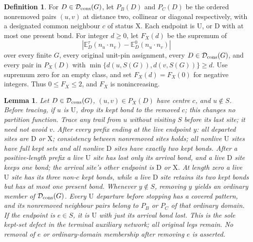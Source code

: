 \documentclass[11pt,reqno]{amsart}
\newtheorem{lemma}[theorem]{Lemma}
\theoremstyle{definition}
\newtheorem{definition}[theorem]{Definition}
\theoremstyle{remark}
\begin{document}
\begin{definition}\label{d:pairenv}
For \(D\in\mathcal D_{\rm cons}(G)\), let \(P_B(D)\) and \(P_C(D)\)
be the ordered nonremoved pairs \((u,v)\) at distance two,
collinear or diagonal respectively, with a designated common neighbour
\(c\) of status \(\mathrm X\). Each endpoint is \(\mathrm U\),
or \(\mathrm D\) with at most one present bond.
For integer \(d\ge0\), let \(F_X(d)\) be the supremum of
\[
 \left|\mathbb E_D^\tau(n_u\cdot n_v)
                    -\mathbb E_D^0(n_u\cdot n_v)\right|
\]
over every finite \(G\), every original unit-pin assignment,
every \(D\in\mathcal D_{\rm cons}(G)\), and every pair in \(P_X(D)\)
with \(\min\{d(u,S(G)),d(v,S(G))\}\ge d\).
Use supremum zero for an empty class, and set \(F_X(d)=F_X(0)\)
for negative integers. Thus \(0\le F_X\le2\), and \(F_X\)
is nonincreasing.
\end{definition}

\begin{lemma}\label{l:closure}
Let \(D\in\mathcal D_{\rm cons}(G)\), \((u,v)\in P_X(D)\) have
centre \(c\), and \(u\notin S\). Before tracing, if \(u\) is
\(\mathrm U\), drop its kept bond to the removed \(c\); this changes
no partition function. Trace any trail from \(u\) without visiting
\(S\) before its last site; it need not avoid \(v\).
After every prefix ending at the live endpoint \(y\):
all departed sites are \(\mathrm D\) or \(\mathrm X\);
consistency between nonremoved sites holds; all nonlive
\(\mathrm U\) sites have full kept sets and all nonlive \(\mathrm D\)
sites have exactly two kept bonds.
After a positive-length prefix a live \(\mathrm U\) site has lost
only its arrival bond, and a live \(\mathrm D\) site keeps one bond;
the arrival site's other endpoint is \(\mathrm D\) or \(\mathrm X\).
At length zero a live \(\mathrm U\) site has its three non-\(c\)
kept bonds, while a live \(\mathrm D\) site retains its two kept
bonds but has at most one present bond.
Whenever \(y\notin S\), removing \(y\) yields an ordinary member
of \(\mathcal D_{\rm cons}(G)\). Every \(\mathrm U\) departure
before stopping has a covered pattern, and its nonremoved neighbour
pairs belong to \(P_B\) or \(P_C\) of that ordinary domain.
If the endpoint is \(e\in S\), it is \(\mathrm U\) with just its
arrival bond lost. This is the sole kept-set defect in the terminal
auxiliary network; all original legs remain. No removal of \(e\)
or ordinary-domain membership after removing \(e\) is asserted.
\end{lemma}
\end{document}
